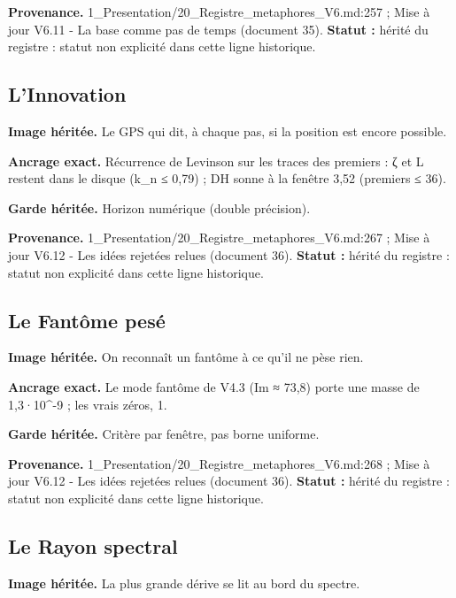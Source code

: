 \documentclass[
  9pt,
  a4paper,
]{article}
\begin{document}
\textbf{Provenance.} 1\_Presentation/20\_Registre\_metaphores\_V6.md:257
; Mise à jour V6.11 - La base comme pas de temps (document 35).
\textbf{Statut :} hérité du registre : statut non explicité dans cette
ligne historique.

\hypertarget{linnovation}{%
\subsection{L'Innovation}\label{linnovation}}

\textbf{Image héritée.} Le GPS qui dit, à chaque pas, si la position est
encore possible.

\textbf{Ancrage exact.} Récurrence de Levinson sur les traces des
premiers : ζ et L restent dans le disque (\textbar k\_n\textbar{} ≤
0,79) ; DH sonne à la fenêtre 3,52 (premiers ≤ 36).

\textbf{Garde héritée.} Horizon numérique (double précision).

\textbf{Provenance.} 1\_Presentation/20\_Registre\_metaphores\_V6.md:267
; Mise à jour V6.12 - Les idées rejetées relues (document 36).
\textbf{Statut :} hérité du registre : statut non explicité dans cette
ligne historique.

\hypertarget{le-fantuxf4me-pesuxe9}{%
\subsection{Le Fantôme pesé}\label{le-fantuxf4me-pesuxe9}}

\textbf{Image héritée.} On reconnaît un fantôme à ce qu'il ne pèse rien.

\textbf{Ancrage exact.} Le mode fantôme de V4.3 (Im ≈ 73,8) porte une
masse de 1,3·10\^{}-9 ; les vrais zéros, 1.

\textbf{Garde héritée.} Critère par fenêtre, pas borne uniforme.

\textbf{Provenance.} 1\_Presentation/20\_Registre\_metaphores\_V6.md:268
; Mise à jour V6.12 - Les idées rejetées relues (document 36).
\textbf{Statut :} hérité du registre : statut non explicité dans cette
ligne historique.

\hypertarget{le-rayon-spectral}{%
\subsection{Le Rayon spectral}\label{le-rayon-spectral}}

\textbf{Image héritée.} La plus grande dérive se lit au bord du spectre.
\end{document}
